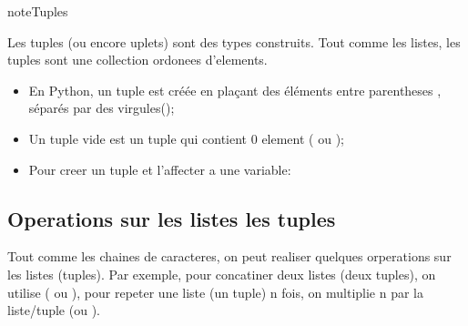 \documentclass[letterpaper,10pt,french]{sphinxmanual}
\begin{document}
\begin{sphinxadmonition}{note}{Tuples}

\sphinxAtStartPar
Les tuples (ou encore uplets) sont des types construits. Tout comme les listes, les tuples sont une collection ordonees d’elements.
\begin{itemize}
\item {} 
\sphinxAtStartPar
En Python, un tuple est créée en plaçant des éléments entre parentheses \sphinxcode{\sphinxupquote{()}} , séparés par des virgules(\sphinxcode{\sphinxupquote{,}});

\item {} 
\sphinxAtStartPar
Un tuple vide est un tuple qui contient 0 element (\sphinxcode{\sphinxupquote{()}} ou );

\item {} 
\sphinxAtStartPar
Pour creer un tuple et l’affecter a une variable:

\end{itemize}

\begin{sphinxVerbatim}[commandchars=\\\{\}]
     
\end{sphinxVerbatim}
\end{sphinxadmonition}


\subsection{Operations sur les listes les tuples}
\label{\detokenize{ch4:operations-sur-les-listes-les-tuples}}
\sphinxAtStartPar
Tout comme les chaines de caracteres, on peut realiser quelques orperations sur les listes (tuples). Par exemple, pour concatiner deux listes (deux tuples), on utilise \sphinxcode{\sphinxupquote{+}}( ou ), pour repeter une liste (un tuple) n fois, on multiplie n par la liste/tuple (ou ).

\begin{sphinxVerbatim}[commandchars=\\\{\}]
  \PYG{p}{[}   \PYG{p}{]}
  \PYG{p}{[}   \PYG{p}{]}
 
\end{sphinxVerbatim}
\end{document}
